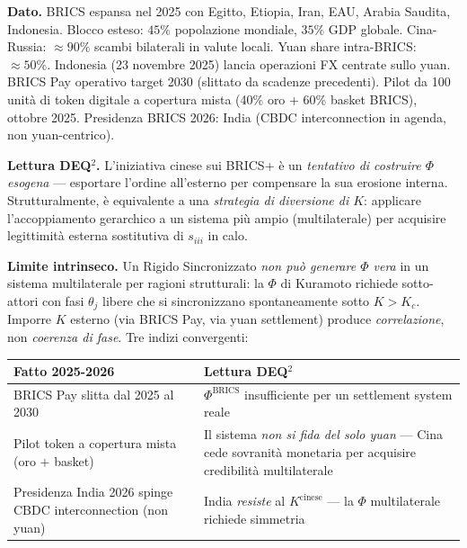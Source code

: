 \Proved{} \textbf{Dato.} BRICS espansa nel 2025 con Egitto, Etiopia,
Iran, EAU, Arabia Saudita, Indonesia. Blocco esteso: \(45\%\)
popolazione mondiale, \(35\%\) GDP globale. Cina-Russia:
\(\approx 90\%\) scambi bilaterali in valute locali. Yuan share
intra-BRICS: \(\approx 50\%\). Indonesia (23 novembre 2025) lancia
operazioni FX centrate sullo yuan. BRICS Pay operativo target 2030
(slittato da scadenze precedenti). Pilot da 100 unità di token digitale
a copertura mista (40\% oro + 60\% basket BRICS), ottobre 2025.
Presidenza BRICS 2026: India (CBDC interconnection in agenda, non
yuan-centrico).

\Hypoth{} \textbf{Lettura DEQ$^2$.} L'iniziativa cinese sui BRICS+ è un
\emph{tentativo di costruire \(\Phi\) esogena} --- esportare l'ordine
all'esterno per compensare la sua erosione interna. Strutturalmente, è
equivalente a una \emph{strategia di diversione di \(K\)}: applicare
l'accoppiamento gerarchico a un sistema più ampio (multilaterale) per
acquisire legittimità esterna sostitutiva di \(s_{iii}\) in calo.

\Proved{} \textbf{Limite intrinseco.} Un Rigido Sincronizzato \emph{non
può generare \(\Phi\) vera} in un sistema multilaterale per ragioni
strutturali: la \(\Phi\) di Kuramoto richiede sotto-attori con fasi
\(\theta_j\) libere che si sincronizzano spontaneamente sotto
\(K > K_c\). Imporre \(K\) esterno (via BRICS Pay, via yuan settlement)
produce \emph{correlazione}, non \emph{coerenza di fase}. Tre indizi
convergenti:

{\def\LTcaptype{none} %
{\small\begin{longtable}[]{@{}
  >{\raggedright\arraybackslash}p{}
  >{\raggedright\arraybackslash}p{}@{}}
\toprule\noalign{}
\begin{minipage}[b]{\linewidth}\raggedright
Fatto 2025-2026
\end{minipage} & \begin{minipage}[b]{\linewidth}\raggedright
Lettura DEQ$^2$
\end{minipage} \\
\midrule\noalign{}
\endhead
\bottomrule\noalign{}
\endlastfoot
BRICS Pay slitta dal 2025 al 2030 & \(\Phi^{\text{BRICS}}\)
insufficiente per un settlement system reale \\
Pilot token a copertura mista (oro \(+\) basket) & Il sistema \emph{non
si fida del solo yuan} --- Cina cede sovranità monetaria per acquisire
credibilità multilaterale \\
Presidenza India 2026 spinge CBDC interconnection (non yuan) & India
\emph{resiste} al \(K^{\text{cinese}}\) --- la \(\Phi\) multilaterale
richiede simmetria \\
\end{longtable}}
}

